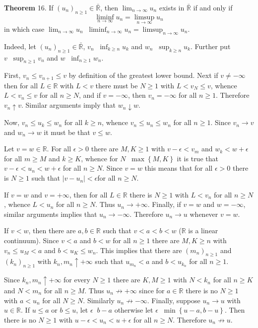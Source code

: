 \documentclass[a4paper]{article}
\newcommand{\obj}[1]{\left\{ #1 \right \}}
\newcommand{\brac}[1]{\left ( #1 \right )}
\newcommand{\abs}[1]{\left | #1 \right |}
\newcommand{\Rbar}{{\bar{\mathbb{R}}}}
\newcommand{\Real}{\mathbb{R}}
\newcommand{\defn}{\mathop{\overset{\Delta}{=}}\nolimits}
\begin{document}
\label{thm:limsup_liminf} \noindent \textbf{Theorem} 16.
If $\brac{u_n}_{n\geq 1}\in\Rbar$, then $\lim_{n\to\infty} u_n$ exists in $\Rbar$ if and only if \[\liminf_{n\to\infty} u_n = \limsup_{n\to\infty} u_n\] in which case $\lim_{n\to\infty} u_n \defn \liminf_{n\to\infty} u_n = \limsup_{n\to\infty} u_n$.

Indeed, let $\brac{u_n}_{n\geq 1}\in \Rbar$, $v_n\defn\inf_{k\geq n} u_k$ and $w_n\defn\sup_{k\geq n} u_k$. Further put $v\defn\sup_{n\geq1}v_n$ and $w\defn\inf_{n\geq1}w_n$.

First, $v_n\leq v_{n+1}\leq v$ by definition of the greatest lower bound. Next if $v\neq-\infty$ then for all $L\in \Real$ with $L<v$ there must be $N\geq1$ with $L<v_N\leq v$, whence $L<v_n\leq v$ for all $n\geq N$, and if $v=-\infty$, then $v_n=-\infty$ for all $n\geq1$. Therefore $v_n\uparrow v$. Similar arguments imply that $w_n\downarrow w$.

Now, $v_n\leq u_k\leq w_n$ for all $k\geq n$, whence $v_n\leq u_n\leq w_n$ for all $n\geq 1$. Since $v_n\to v$ and $w_n\to w$ it must be that $v\leq w$.

Let $v=w\in \Real$. For all $\epsilon>0$ there are $M,K\geq 1$ with $v-\epsilon<v_m$ and $w_k<w+\epsilon$ for all $m\geq M$ and $k\geq K$, whence for $N\defn \max\obj{M,K}$ it is true that $v-\epsilon<u_n<w+\epsilon$ for all $n\geq N$. Since $v=w$ this means that for all $\epsilon>0$ there is $N\geq1$ such that $\abs{v-u_n}<\epsilon$for all $n\geq N$.

If $v=w$ and $v=+\infty$, then for all $L\in \Real$ there is $N\geq 1$ with $L<v_n$ for all $n\geq N$, whence $L<u_n$ for all $n\geq N$. Thus $u_n\to +\infty$. Finally, if $v=w$ and $w=-\infty$, similar arguments implies that $u_n\to-\infty$. Therefore $u_n\to u$ whenever $v=w$.

If $v<w$, then there are $a,b\in \Real$ such that $v<a<b<w$ ($\Real$ is a linear continuum). Since $v<a$ and $b<w$ for all $n\geq1$ there are $M,K\geq n$ with $v_n\leq u_M < a$ and $b < u_K \leq w_n$. This implies that there are $\brac{m_n}_{n\geq1}$ and $\brac{k_n}_{n\geq1}$ with $k_n,m_n\uparrow+\infty$ such that $u_{m_n}<a$ and $b<u_{k_n}$ for all $n\geq 1$.

Since $k_n,m_n\uparrow+\infty$ for every $N\geq1$ there are $K,M\geq 1$ with $N<k_n$ for all $n\geq K$ and $N<m_n$ for all $n\geq M$. Thus $u_n\not\to+\infty$ since for $a\in \Real$ there is no $N\geq1$ with $a<u_n$ for all $N\geq N$. Similarly $u_n\not\to-\infty$. Finally, suppose $u_n\to u$ with $u\in \Real$. If $u\leq a$ or $b\leq u$, let $\epsilon\defn b-a$ otherwise let $\epsilon\defn\min\obj{u-a,b-u}$. Then there is no $N\geq1$ with $u-\epsilon<u_n<u+\epsilon$ for all $n\geq N$. Therefore $u_n\not\to u$.
\end{document}
